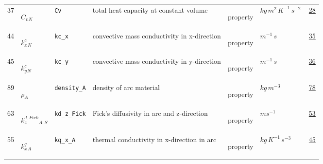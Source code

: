 \begin{longtable}{|p{1cm}|p{2.5cm}|p{4.5cm}|p{8cm}|p{3.0cm}|p{3cm}|p{1cm}|}
                 \\
            37
             & \hypertarget{"v:37"}{ $ {{C_v}}{_{N}} $}
             & \verb|Cv|
             & total heat capacity at constant volume
             & \begin{lay}property \end{lay}
             & $ kg \,m^{2} \,K^{-1} \,s^{-2} \, $
             &                 \hyperlink{"e:28"}{ 28 }
                 \\
            44
             & \hypertarget{"v:44"}{ $ {{k^c_x}}{_{N}} $}
             & \verb|kc_x|
             &  convective mass conductivity in x-direction
             & \begin{lay}property \end{lay}
             & $ m^{-1} \,s \, $
             &                 \hyperlink{"e:35"}{ 35 }
                 \\
            45
             & \hypertarget{"v:45"}{ $ {{k^c_y}}{_{N}} $}
             & \verb|kc_y|
             &  convective mass conductivity in y-direction
             & \begin{lay}property \end{lay}
             & $ m^{-1} \,s \, $
             &                 \hyperlink{"e:36"}{ 36 }
                 \\
            89
             & \hypertarget{"v:89"}{ $ {\rho}{_{A}} $}
             & \verb|density_A|
             & density of arc material
             & \begin{lay}property \end{lay}
             & $ kg \,m^{-3} \, $
             &                 \hyperlink{"e:78"}{ 78 }
                 \\
            63
             & \hypertarget{"v:63"}{ $ {{k^{d,Fick}_z}}{_{A, S}} $}
             & \verb|kd_z_Fick|
             & Fick's diffusivity in arc and z-direction 
             & \begin{lay}property \end{lay}
             & $ m s^{-1} \, $
             &                 \hyperlink{"e:53"}{ 53 }
                 \\
            55
             & \hypertarget{"v:55"}{ $ {{k^q_x}}{_{A}} $}
             & \verb|kq_x_A|
             & thermal conductivity in x-direction in arc
             & \begin{lay}property \end{lay}
             & $ kg \,K^{-1} \,s^{-3} \, $
             &                 \hyperlink{"e:45"}{ 45 }

\end{longtable}
